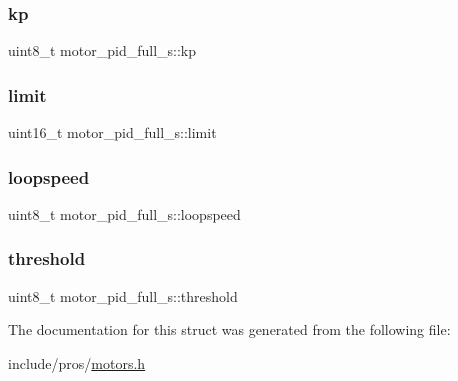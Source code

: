 \subsubsection{\texorpdfstring{kp}{kp}}
{\footnotesize\ttfamily uint8\+\_\+t motor\+\_\+pid\+\_\+full\+\_\+s\+::kp}

\mbox{\label{structmotor__pid__full__s_a98141ce9bce70a500cf18c7a92d866c5}} 
\subsubsection{\texorpdfstring{limit}{limit}}
{\footnotesize\ttfamily uint16\+\_\+t motor\+\_\+pid\+\_\+full\+\_\+s\+::limit}

\mbox{\label{structmotor__pid__full__s_a567385b82081690c526a618b2110e030}} 
\subsubsection{\texorpdfstring{loopspeed}{loopspeed}}
{\footnotesize\ttfamily uint8\+\_\+t motor\+\_\+pid\+\_\+full\+\_\+s\+::loopspeed}

\mbox{\label{structmotor__pid__full__s_a50b463b6ffd906bfef9ae1edc7cc872e}} 
\subsubsection{\texorpdfstring{threshold}{threshold}}
{\footnotesize\ttfamily uint8\+\_\+t motor\+\_\+pid\+\_\+full\+\_\+s\+::threshold}



The documentation for this struct was generated from the following file\+:\begin{DoxyCompactItemize}
\item 
include/pros/\mbox{\hyperlink{motors_8h}{motors.\+h}}\end{DoxyCompactItemize}
